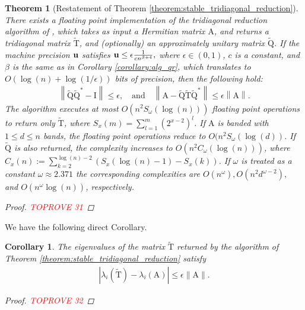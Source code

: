 \documentclass{article}
\newcommand{\labs}{\left|}
\newcommand{\rabs}{\right|}
\newcommand{\lnorm}{\left\|}
\newcommand{\rnorm}{\right\|}
\newcommand{\lpar}{\left(}
\newcommand{\rpar}{\right)}
\newtheorem{theorem}{Theorem}[section]
\newtheorem{corollary}{Corollary}[section]
\newcommand\matA{\boldsymbol{\mathrm{A}}}
\newcommand\matI{\boldsymbol{\mathrm{I}}}
\newcommand\matQtilde{\widetilde{\boldsymbol{\mathrm{Q}}}}
\newcommand\matTtilde{\widetilde{\boldsymbol{\mathrm{T}}}}
\newcommand{\umach}{\textbf{\textup{u}}}
\newcommand{\cmm}{\beta}
\begin{document}
\begin{theorem}[Restatement of Theorem \ref{theorem:stable_tridiagonal_reduction}]
    \label{theorem:stable_tridiagonal_reduction_appendix}
    There exists a floating point implementation of the tridiagonal reduction algorithm of \cite{schonhage1972unitare}, which takes as input a Hermitian matrix $\matA$, and returns a tridiagonal matrix $\matTtilde$, and (optionally) an approximately unitary matrix $\matQtilde$. If the machine precision $\umach$ satisfies
    $
        \umach \leq \epsilon\frac{1}{cn^{\beta+4}},
    $
    where $\epsilon\in(0,1)$, $c$ is a constant, and $\cmm$ is the same as in Corollary \ref{corollary:alg_qr}, which translates to $O(\log(n)+\log(1/\epsilon))$ bits of precision, then the following hold:
    \begin{align*}
        \lnorm \matQtilde\matQtilde^*-\matI\rnorm \leq \epsilon,
        \quad
        \text{and}
        \quad
        \lnorm \matA - \matQtilde\matTtilde\matQtilde^* \rnorm \leq \epsilon \lnorm \matA \rnorm.
    \end{align*}
    The algorithm executes at most $O\lpar
                    n^2 S_{\omega}(\log(n))
    \rpar$ floating point operations to return only $\matTtilde$, where $S_x(m)=\sum_{l=1}^m (2^{x-2})^l$.
    If $\matA$ is banded with $1\leq d\leq n$ bands, the floating point operations reduce to $O(n^2 S_{\omega}(\log(d))$.
    If $\matQtilde$ is also returned, the complexity increases to $O(n^2C_{\omega}(\log(n)))$, 
    where $C_{x}(n) := 
    \sum_{k=2}^{\log(n)-2}
    \lpar
        S_{x}(\log(n)-1) - S_{x}(k)
    \rpar$. If $\omega$ is treated as a constant $\omega\approx 2.371$ the corresponding complexities are $O(n^{\omega}), O(n^2d^{\omega-2}),$ and $O(n^{\omega}\log(n))$, respectively.
    \begin{proof}\textcolor{red}{TOPROVE 31}\end{proof}
\end{theorem}
We have the following direct Corollary.

\begin{corollary}
    \label{corollary:tridiagonal_reduction_eigenvalues}
    The eigenvalues of the matrix $\matTtilde$ returned by the algorithm of Theorem \ref{theorem:stable_tridiagonal_reduction} satisfy
    \begin{align*}
        \labs \lambda_i(\matTtilde)-\lambda_i(\matA) \rabs \leq \epsilon \|\matA\|.
    \end{align*}
    \begin{proof}\textcolor{red}{TOPROVE 32}\end{proof}
\end{corollary}
\end{document}
